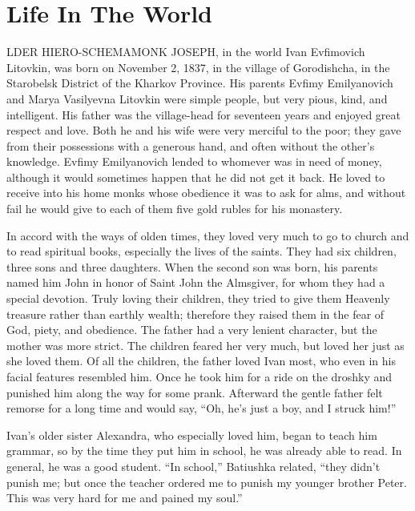 \chapter{Life In The World}
LDER HIERO-SCHEMAMONK JOSEPH, in the world Ivan Evfimovich Litovkin, was born on November 2, 1837, in the village of Gorodishcha, in the Starobelsk District of the Kharkov Province. His parents Evfimy Emilyanovich and Marya Vasilyevna Litovkin were simple people, but very pious, kind, and intelligent. His father was the village-head for seventeen years and enjoyed great respect and love. Both he and his wife were very merciful to the poor; they gave from their possessions with a generous hand, and often without the other's knowledge. Evfimy Emilyanovich lended to whomever was in need of money, although it would sometimes happen that he did not get it back. He loved to receive into his home monks whose obedience it was to ask for alms, and without fail he would give to each of them five gold rubles for his monastery.

In accord with the ways of olden times, they loved very much to go to church and to read spiritual books, especially the lives of the saints. They had six children, three sons and three daughters. When the second son was born, his parents named him John in honor of Saint John the Almsgiver, for whom they had a special devotion. Truly loving their children, they tried to give them Heavenly treasure rather than earthly wealth; therefore they raised them in the fear of God, piety, and obedience. The father had a very lenient character, but the mother was more strict. The children feared her very much, but loved her just as she loved them. Of all the children, the father loved Ivan most, who even in his facial features resembled him. Once he took him for a ride on the droshky and punished him along the way for some prank. Afterward the gentle father felt remorse for a long time and would say, ``Oh, he's just a boy, and I struck him!''

Ivan's older sister Alexandra, who especially loved him, began to teach him grammar, so by the time they put him in school, he was already able to read. In general, he was a good student. ``In school,'' Batiushka related, ``they didn't punish me; but once the teacher ordered me to punish my younger brother Peter. This was very hard for me and pained my soul.''

